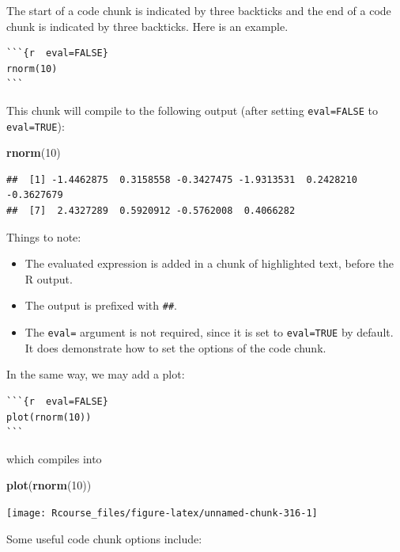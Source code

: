 \documentclass[]{book}
\newenvironment{Shaded}{\begin{snugshade}}{\end{snugshade}}
\newcommand{\DecValTok}[1]{\textcolor[rgb]{0.00,0.00,0.81}{#1}}
\newcommand{\KeywordTok}[1]{\textcolor[rgb]{0.13,0.29,0.53}{\textbf{#1}}}
\newcommand{\NormalTok}[1]{#1}
\providecommand{\tightlist}{%
  \setlength{\itemsep}{0pt}\setlength{\parskip}{0pt}}
\theoremstyle{definition}
\theoremstyle{definition}
\theoremstyle{definition}
\theoremstyle{remark}
\begin{document}
The start of a code chunk is indicated by three backticks and the end of a code chunk is indicated by three backticks.
Here is an example.

\begin{verbatim}
```{r  eval=FALSE}
rnorm(10)
```
\end{verbatim}

This chunk will compile to the following output (after setting \texttt{eval=FALSE} to \texttt{eval=TRUE}):

\begin{Shaded}
\begin{Highlighting}[]
\KeywordTok{rnorm}\NormalTok{(}\DecValTok{10}\NormalTok{)}
\end{Highlighting}
\end{Shaded}

\begin{verbatim}
##  [1] -1.4462875  0.3158558 -0.3427475 -1.9313531  0.2428210 -0.3627679
##  [7]  2.4327289  0.5920912 -0.5762008  0.4066282
\end{verbatim}

Things to note:

\begin{itemize}
\tightlist
\item
  The evaluated expression is added in a chunk of highlighted text, before the R output.
\item
  The output is prefixed with \texttt{\#\#}.
\item
  The \texttt{eval=} argument is not required, since it is set to \texttt{eval=TRUE} by default. It does demonstrate how to set the options of the code chunk.
\end{itemize}

In the same way, we may add a plot:

\begin{verbatim}
```{r  eval=FALSE}
plot(rnorm(10))
```
\end{verbatim}

which compiles into

\begin{Shaded}
\begin{Highlighting}[]
\KeywordTok{plot}\NormalTok{(}\KeywordTok{rnorm}\NormalTok{(}\DecValTok{10}\NormalTok{))}
\end{Highlighting}
\end{Shaded}

\texttt{[image: Rcourse\_files/figure-latex/unnamed-chunk-316-1]}

Some useful code chunk options include:
\end{document}
